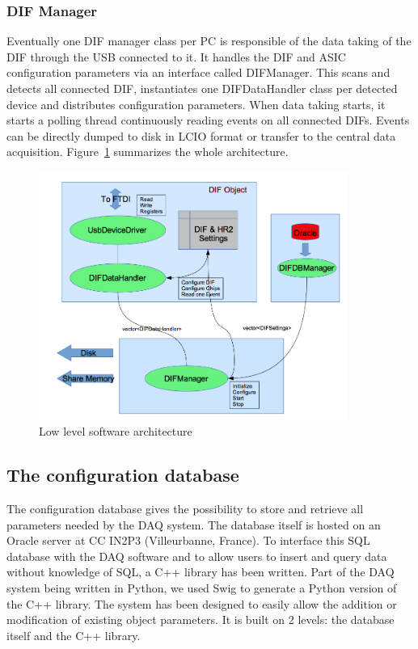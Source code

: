 \documentclass[english]{article}
\begin{document}
\subsubsection{DIF Manager}
\label{sec:DIFManager}

Eventually one DIF manager class per PC is responsible of the data
taking of the DIF through the USB connected to it. It handles the DIF and ASIC
configuration parameters via an interface called  DIFManager. This scans and
detects all connected DIF, instantiates one DIFDataHandler class per detected
device and distributes configuration parameters. %
When data taking starts, it starts a polling thread continuously
reading events on all connected DIFs. Events can be directly dumped
to disk in LCIO format or transfer to the central data acquisition.
Figure~\ref{software_archi} summarizes the whole architecture.

\begin{figure}
\includegraphics[width=0.9\textwidth]{./LowLevelHardware.png}

\caption{Low level software architecture}
\label{software_archi}

\end{figure}


\subsection{The configuration database}

The configuration database gives the possibility to store and retrieve
all parameters needed by the DAQ system. The database itself is hosted
on an Oracle server at CC IN2P3 (Villeurbanne, France). To interface
this SQL database with the DAQ software and to allow users to insert
and query data without knowledge of SQL, a C++ library has been written.
Part of the DAQ system being written in Python, we used Swig to generate
a Python version of the C++ library. The system has been designed
to easily allow the addition or modification of existing object parameters.
It is built on 2 levels: the database itself and the C++ library.
\end{document}
